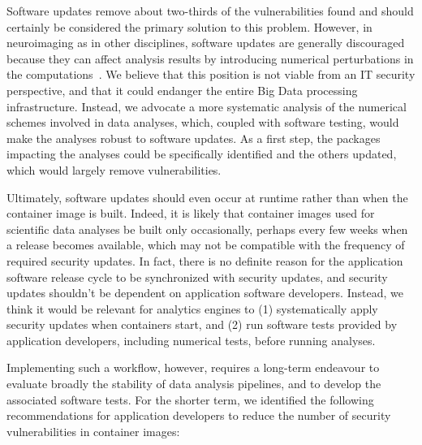 \documentclass[a4paper,num-refs]{oup-contemporary}
\begin{document}
Software updates remove about two-thirds of the vulnerabilities found and
should certainly be considered the primary solution to this problem.
However, in neuroimaging as in other disciplines, software updates are
generally discouraged because they can affect analysis results by
introducing numerical perturbations in the
computations~\cite{gronenschild2012effects,glatard2015reproducibility}. We
believe that this position is not viable from an IT security perspective,
and that it could endanger the entire Big Data processing infrastructure.
 Instead, we advocate a more systematic
analysis of the numerical schemes involved in data analyses, which, coupled
with software testing, would make the analyses robust to software updates.
As a first step, the packages impacting the analyses could be specifically
identified and the others updated, which would largely remove
vulnerabilities.

Ultimately, software updates should even occur at runtime rather than when
the container image is built. Indeed, it is likely that container images
used for scientific data analyses be built only occasionally, perhaps every
few weeks when a release becomes available, which may not be compatible
with the frequency of required security updates. In fact, there is no
definite reason for the application software release cycle to be
synchronized with security updates, and security updates shouldn't be
dependent on application software developers. Instead, we think it would be
relevant for analytics engines to (1) systematically apply security updates
when containers start, and (2) run software tests provided by application
developers, including numerical tests, before running analyses. 

Implementing such a workflow, however, requires a long-term endeavour to
evaluate broadly the stability of data analysis pipelines, and to develop
the associated software tests. For the shorter term, we identified the
following recommendations for application developers to reduce the number
of security vulnerabilities in container images:
\end{document}

